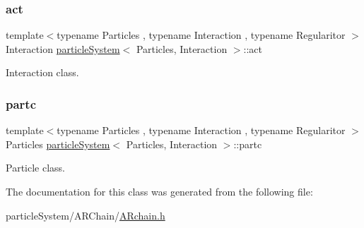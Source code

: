 \subsubsection{\texorpdfstring{act}{act}}
{\footnotesize\ttfamily template$<$typename Particles , typename Interaction , typename Regularitor $>$ \\
Interaction \mbox{\hyperlink{classparticle_system}{particle\+System}}$<$ Particles, Interaction $>$\+::act}



Interaction class. 

\mbox{\label{class_a_rchain_a48cb24fbd9d72503a5e464a02760e814}} 
\subsubsection{\texorpdfstring{partc}{partc}}
{\footnotesize\ttfamily template$<$typename Particles , typename Interaction , typename Regularitor $>$ \\
Particles \mbox{\hyperlink{classparticle_system}{particle\+System}}$<$ Particles, Interaction $>$\+::partc}



Particle class. 



The documentation for this class was generated from the following file\+:\begin{DoxyCompactItemize}
\item 
particle\+System/\+A\+R\+Chain/\mbox{\hyperlink{_a_rchain_8h}{A\+Rchain.\+h}}\end{DoxyCompactItemize}
